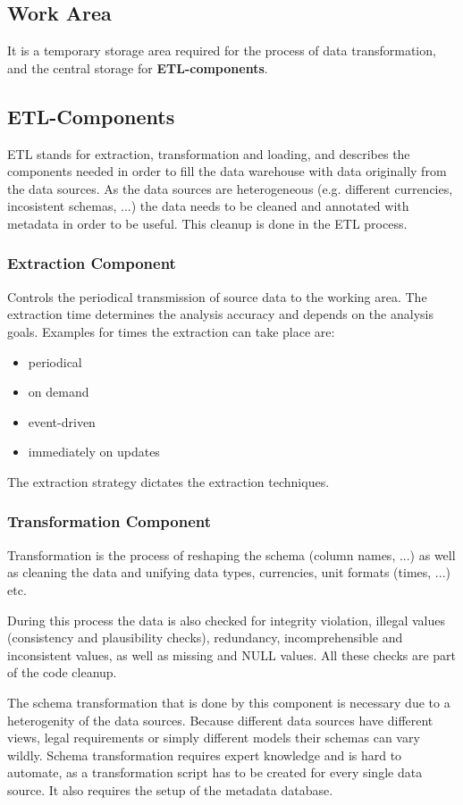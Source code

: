 \documentclass{article}
\begin{document}
\subsection{Work Area}
It is a temporary storage area required for the process of data transformation, and the central storage for \textbf{ETL-components}.

\subsection{ETL-Components}
ETL stands for extraction, transformation and loading, and describes the components needed in order to fill the data warehouse with data originally from the data sources.
As the data sources are heterogeneous (e.g. different currencies, incosistent schemas, ...) the data needs to be cleaned and annotated with metadata in order to be useful.
This cleanup is done in the ETL process.

\subsubsection{Extraction Component}
Controls the periodical transmission of source data to the working area.
The extraction time determines the analysis accuracy and depends on the analysis goals.
Examples for times the extraction can take place are:
\begin{itemize}
    \item periodical
    \item on demand
    \item event-driven
    \item immediately on updates
\end{itemize}
The extraction strategy dictates the extraction techniques.

\subsubsection{Transformation Component}
Transformation is the process of reshaping the schema (column names, ...) as well as cleaning the data and unifying data types, currencies, unit formats (times, ...) etc.

During this process the data is also checked for integrity violation, illegal values (consistency and plausibility checks), redundancy, incomprehensible and inconsistent values, as well as missing and NULL values.
All these checks are part of the code cleanup.

The schema transformation that is done by this component is necessary due to a heterogenity of the data sources.
Because different data sources have different views, legal requirements or simply different models their schemas can vary wildly.
Schema transformation requires expert knowledge and is hard to automate, as a transformation script has to be created for every single data source.
It also requires the setup of the metadata database.
\end{document}
